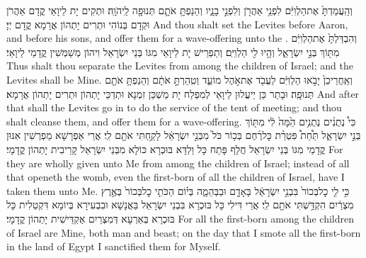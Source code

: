 {וְהַֽעֲמַדְתָּ֙ אֶת\maqqaf הַלְוִיִּ֔ם לִפְנֵ֥י אַהֲרֹ֖ן וְלִפְנֵ֣י בָנָ֑יו וְהֵנַפְתָּ֥ אֹתָ֛ם תְּנוּפָ֖ה לַֽיהֹוָֽה׃}
{וּתְקִים יָת לֵיוָאֵי קֳדָם אַהֲרֹן וּקְדָם בְּנוֹהִי וּתְרִים יָתְהוֹן אֲרָמָא קֳדָם יְיָ׃}
{And thou shalt set the Levites before Aaron, and before his sons, and offer them for a wave-offering unto the \lord.}{}
{וְהִבְדַּלְתָּ֙ אֶת\maqqaf הַלְוִיִּ֔ם מִתּ֖וֹךְ בְּנֵ֣י יִשְׂרָאֵ֑ל וְהָ֥יוּ לִ֖י הַלְוִיִּֽם׃}
{וְתַפְרֵישׁ יָת לֵיוָאֵי מִגּוֹ בְּנֵי יִשְׂרָאֵל וִיהוֹן מְשַׁמְּשִׁין קֳדָמַי לֵיוָאֵי׃}
{Thus shalt thou separate the Levites from among the children of Israel; and the Levites shall be Mine.}{}
{וְאַֽחֲרֵי\maqqaf כֵן֙ יָבֹ֣אוּ הַלְוִיִּ֔ם לַעֲבֹ֖ד אֶת\maqqaf אֹ֣הֶל מוֹעֵ֑ד וְטִֽהַרְתָּ֣ אֹתָ֔ם וְהֵנַפְתָּ֥ אֹתָ֖ם תְּנוּפָֽה׃}
{וּבָתַר כֵּן יֵיעֲלוּן לֵיוָאֵי לְמִפְלַח יָת מַשְׁכַּן זִמְנָא וּתְדַכֵּי יָתְהוֹן וּתְרִים יָתְהוֹן אֲרָמָא׃}
{And after that shall the Levites go in to do the service of the tent of meeting; and thou shalt cleanse them, and offer them for a wave-offering.}{}
{כִּי֩ נְתֻנִ֨ים נְתֻנִ֥ים הֵ֙מָּה֙ לִ֔י מִתּ֖וֹךְ בְּנֵ֣י יִשְׂרָאֵ֑ל תַּ֩חַת֩ פִּטְרַ֨ת כׇּל\maqqaf רֶ֜חֶם בְּכ֥וֹר כֹּל֙ מִבְּנֵ֣י יִשְׂרָאֵ֔ל לָקַ֥חְתִּי אֹתָ֖ם לִֽי׃}
{אֲרֵי אַפְרָשָׁא מַפְרְשִׁין אִנּוּן קֳדָמַי מִגּוֹ בְּנֵי יִשְׂרָאֵל חֲלָף פָּתַח כָּל וַלְדָּא בּוּכְרָא כּוֹלָא מִבְּנֵי יִשְׂרָאֵל קָרֵיבִית יָתְהוֹן קֳדָמָי׃}
{For they are wholly given unto Me from among the children of Israel; instead of all that openeth the womb, even the first-born of all the children of Israel, have I taken them unto Me.}{}
{כִּ֣י לִ֤י כׇל\maqqaf בְּכוֹר֙ בִּבְנֵ֣י יִשְׂרָאֵ֔ל בָּאָדָ֖ם וּבַבְּהֵמָ֑ה בְּי֗וֹם הַכֹּתִ֤י כׇל\maqqaf בְּכוֹר֙ בְּאֶ֣רֶץ מִצְרַ֔יִם הִקְדַּ֥שְׁתִּי אֹתָ֖ם לִֽי׃}
{אֲרֵי דִּילִי כָּל בּוּכְרָא בִּבְנֵי יִשְׂרָאֵל בַּאֲנָשָׁא וּבִבְעִירָא בְּיוֹמָא דִּקְטַלִית כָּל בּוּכְרָא בְּאַרְעָא דְּמִצְרַיִם אַקְדֵּישִׁית יָתְהוֹן קֳדָמָי׃}
{For all the first-born among the children of Israel are Mine, both man and beast; on the day that I smote all the first-born in the land of Egypt I sanctified them for Myself.}{}

